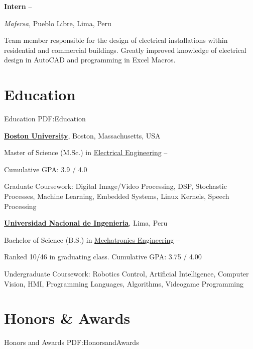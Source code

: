 \documentclass[letterpaper,MMMyyyy,nonstop]{simpleresumecv}
\begin{document}
\begin{body}
\BigGap
\textbf{Intern}
\hfill
{} --
\begin{detail}
\normalsize{ \textit{Mafersa},
Pueblo Libre, Lima, Peru }
\end{detail}

\GapNoBreak
\BulletItem
Team member responsible for the design of electrical installations within residential and commercial buildings.
\BulletItem
Greatly improved knowledge of electrical design in AutoCAD and programming in Excel Macros.


\section
{Education}
{Education}
{PDF:Education}

\href{http://www.bu.edu/}
{\textbf{Boston University}},
Boston, Massachusetts, USA

\GapNoBreak
\BulletItem
Master of Science (M.Sc.) in
\href{http://www.bu.edu/ece/}
{Electrical Engineering}
\hfill
{} --
\begin{detail}
\SubBulletItem
Cumulative GPA: 3.9 / 4.0
\end{detail}
\BulletItem
Graduate Coursework: Digital Image/Video Processing, DSP, Stochastic Processes, Machine Learning, Embedded Systems, Linux Kernels, Speech Processing

\BigGap
\href{http://www.uni.edu.pe/}
{\textbf{Universidad Nacional de Ingenieria}},
Lima, Peru

\GapNoBreak
\BulletItem
Bachelor of Science (B.S.) in
\href{http://www.fim.uni.edu.pe/}
{Mechatronics Engineering}
\hfill
{} --
\begin{detail}
\SubBulletItem
Ranked 10/46 in graduating class.
\SubBulletItem
Cumulative GPA: 3.75 / 4.00
\end{detail}
\BulletItem
Undergraduate Coursework: Robotics Control, Artificial Intelligence, Computer Vision, HMI, Programming Languages, Algorithms, Videogame Programming


\section
{Honors \newline
\& Awards}
{Honors and Awards}
{PDF:HonorsandAwards}


\end{body}
\end{document}
